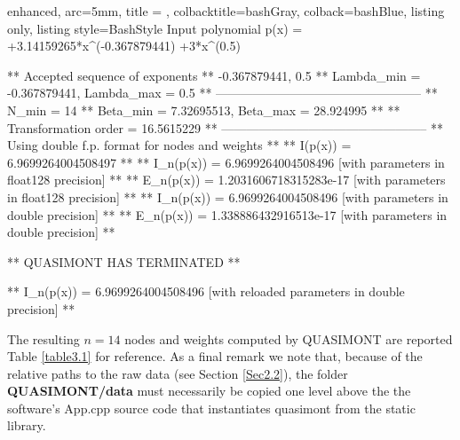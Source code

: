 \documentclass[a4paper, twosided]{book}
\begin{document}
\vspace{0.5cm}
\begin{tcblisting}{enhanced,
                   arc=5mm,
                   title = \color{black}{\large \ttfamily Execution of external source code using QUASIMONT' static library},
                   colbacktitle=bashGray,
                   colback=bashBlue,
                   listing only,
                   listing style=BashStyle}
 Input polynomial p(x) =  +3.14159265*x^(-0.367879441) +3*x^(0.5)

 ** Accepted sequence of exponents ** 
    {-0.367879441, 0.5}
 ** Lambda_min = -0.367879441, Lambda_max = 0.5 **
 --------------------------------------------------
 ** N_min = 14
 ** Beta_min = 7.32695513, Beta_max = 28.924995 **
 ** Transformation order = 16.5615229 **
 --------------------------------------------------
 ** Using double f.p. format for nodes and weights **
 ** I(p(x))   = 6.9699264004508497 **
 ** I_n(p(x)) = 6.9699264004508496      [with parameters in float128 precision] **
 ** E_n(p(x)) = 1.2031606718315283e-17  [with parameters in float128 precision] **
 ** I_n(p(x)) = 6.9699264004508496      [with parameters in double precision] **
 ** E_n(p(x)) = 1.338886432916513e-17   [with parameters in double precision] **

 ** QUASIMONT HAS TERMINATED **

 ** I_n(p(x)) = 6.9699264004508496      [with reloaded parameters in double precision] **
\end{tcblisting}

\noindent
The resulting $n=14$ nodes and weights computed by QUASIMONT are reported Table \ref{table3.1} for reference. As a final remark we note that, because of the relative paths to the raw data (see Section \ref{Sec2.2}), the folder \colorbox{poliGrayBlue}{\textbf{QUASIMONT/data}} must necessarily be copied one level above the the software's \colorbox{poliGrayBlue}{App.cpp} source code that instantiates \colorbox{poliGrayBlue}{quasimont} from the static library.
\end{document}
